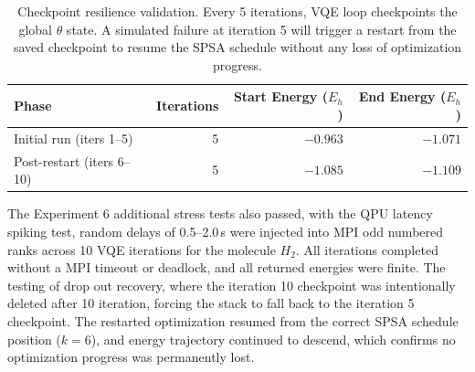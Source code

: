 \begin{table}[htbp]
\centering
\renewcommand{\arraystretch}{1.2}
\caption{Checkpoint resilience validation. Every 5 iterations, VQE loop checkpoints the global $\theta$ state. A simulated failure at iteration 5 will trigger a restart from the saved checkpoint to resume the SPSA schedule without any loss of optimization progress.}
\label{table:resilience}
\begin{tabular}{|l|r|r|r|}
\hline
\textbf{Phase} & \textbf{Iterations} & \textbf{Start Energy ($E_h$)} & \textbf{End Energy ($E_h$)} \\ \hline
Initial run (iters 1--5) & 5 & $-0.963$ & $-1.071$ \\ \hline
Post-restart (iters 6--10) & 5 & $-1.085$ & $-1.109$ \\ \hline
\end{tabular}
\end{table}

The Experiment 6 additional stress tests also passed, with the QPU latency spiking test, 
random delays of 0.5--2.0\,s were injected into MPI odd numbered ranks across 10 VQE iterations for 
the molecule $H_{2}$. All iterations completed without a MPI timeout or deadlock, and all returned 
energies were finite. The testing of drop out recovery, where the iteration 10 checkpoint was intentionally 
deleted after 10 iteration, forcing the stack to fall back to the iteration 5 checkpoint. The 
restarted optimization resumed from the correct SPSA schedule position ($k=6$), and  
energy trajectory continued to descend, which confirms no optimization progress was permanently lost.

